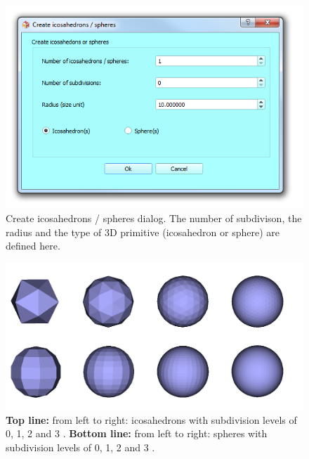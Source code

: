 \begin{figure}
  \centering
  \includegraphics[scale=0.5]{images/09/create_3D_primitives/icosahedrons_dialog.png} 
	\caption{Create icosahedrons / spheres dialog. The number of subdivison, the radius and the type of 3D primitive (icosahedron or sphere) are defined here.}
 \label{icosahedrons_dialog}
\end{figure}

\begin{figure}
  \centering
  \includegraphics[scale=0.35]{images/09/create_3D_primitives/spheric.png} 
	\caption{\textbf{Top line:} from left to right: icosahedrons with subdivision levels of 0, 1, 2 and 3 . \textbf{Bottom line:} from left to right: spheres with  subdivision levels of 0, 1, 2 and 3 .
	}
 \label{spheric}
\end{figure}



